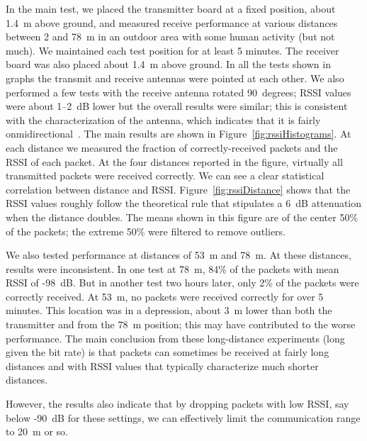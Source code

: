 In the main test, we placed the transmitter board at a fixed position, about 1.4~m above ground, and measured receive
performance at various distances between 2 and 78~m in an outdoor area with some human activity (but not much). We 
maintained each test position for at least 5 minutes.
The receiver board was also placed about 1.4~m above ground. In all the tests shown in graphs the transmit
and receive antennas were pointed at each other. We also performed a few tests with the receive antenna rotated 90~degrees;
RSSI values were about 1--2~dB lower but the overall results were similar; this is consistent with the characterization
of the antenna, which indicates that it is fairly onmidirectional~\cite{LAUNCHXL-CC1350-4}.
The main results are shown in Figure~\ref{fig:rssiHistograms}.
At each distance we measured the fraction of correctly-received packets and the RSSI of each packet. At the four
distances reported in the figure, virtually all transmitted packets were received correctly. We can see a clear
statistical correlation between distance and RSSI. Figure~\ref{fig:rssiDistance} shows that the RSSI values
roughly follow the theoretical rule that stipulates a 6~dB attenuation when the distance doubles. The means
shown in this figure are of the center 50\% of the packets; the extreme 50\% were filtered to remove outliers.

We also tested performance at distances of 53~m and 78~m. At these distances, results were inconsistent. In one test
at 78~m, 84\% of the packets with mean RSSI of -98~dB. But in another test two hours later, only 2\% of the packets
were correctly received. At 53~m, no packets were received correctly for over 5 minutes. This location was in a depression,
about 3~m lower than both the transmitter and from the 78~m position; this may have contributed to the worse performance.
The main conclusion from these long-distance experiments (long given the bit rate) is that packets can sometimes be received
at fairly long distances and with RSSI values that typically characterize much shorter distances. 

However, the results also indicate that by dropping packets with low RSSI, say below -90~dB for these settings, we can
effectively limit the communication range to 20~m or so.
